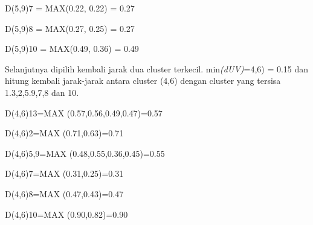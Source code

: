 \begin{enumerate}
D(5,9)7 = MAX(0.22, 0.22) = 0.27

D(5,9)8 = MAX(0.27, 0.25) = 0.27

D(5,9)10 = MAX(0.49, 0.36) = 0.49


\begin{table}[htbp]
\centering
\caption{Matrik Jarak, d(5,9)}
\label{tab:my-table}
\end{table}

Selanjutnya dipilih kembali jarak dua cluster terkecil. min\textit{(dUV)}=4,6) = 0.15 dan hitung kembali jarak-jarak antara cluster (4,6)  dengan cluster yang tersisa 1.3,2,5.9,7,8 dan 10.

D(4,6)13=MAX (0.57,0.56,0.49,0.47)=0.57

D(4,6)2=MAX (0.71,0.63)=0.71

D(4,6)5,9=MAX (0.48,0.55,0.36,0.45)=0.55

D(4,6)7=MAX (0.31,0.25)=0.31

D(4,6)8=MAX (0.47,0.43)=0.47

D(4,6)10=MAX (0.90,0.82)=0.90


\end{enumerate}
